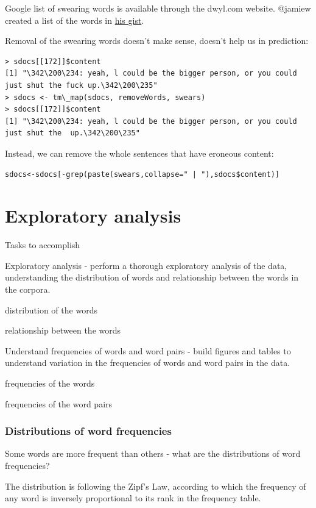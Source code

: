\documentclass{article}
\begin{document}
Google list of swearing words is available through the dwyl.com website. @jamiew created a list of the words in \href{https://gist.github.com/jamiew/1112488}{his gist}.

Removal of the swearing words doesn't make sense, doesn't help us in prediction:

\begin{lstlisting}
> sdocs[[172]]$content
[1] "\342\200\234: yeah, l could be the bigger person, or you could just shut the fuck up.\342\200\235"
> sdocs <- tm\_map(sdocs, removeWords, swears)
> sdocs[[172]]$content
[1] "\342\200\234: yeah, l could be the bigger person, or you could just shut the  up.\342\200\235"
\end{lstlisting}

Instead, we can remove the whole sentences that have eroneous content:

\begin{lstlisting}
sdocs<-sdocs[-grep(paste(swears,collapse=" | "),sdocs$content)]
\end{lstlisting}


\section{Exploratory analysis}

Tasks to accomplish

Exploratory analysis - perform a thorough exploratory analysis of the data, understanding the distribution of words and relationship between the words in the corpora.

distribution of the words

relationship between the words
 
Understand frequencies of words and word pairs - build figures and tables to understand variation in the frequencies of words and word pairs in the data.

frequencies of the words

frequencies of the word pairs

\subsubsection{Distributions of word frequencies}

Some words are more frequent than others - what are the distributions of word frequencies? 

The distribution is following the Zipf's Law, according to which the frequency of any word is inversely proportional to its rank in the frequency table.
\end{document}
